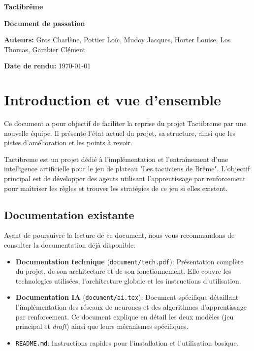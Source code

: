 \documentclass[]{article}
\begin{document}
\begin{titlepage}
  \centering

  \vspace*{4cm}

  \Huge
  \textbf{Tactibrême}

  \vspace{1cm}

  \huge
  \textbf{Document de passation}

  \vfill

  \Large
  \textbf{Auteurs:} Gros Charlène, Pottier Loïc, Mudoy Jacques, Horter Louise, Los Thomas, Gambier Clément

  \vspace{1cm}

  \textbf{Date de rendu:} \today

\end{titlepage}


\tableofcontents

\newpage

\section{Introduction et vue d'ensemble}

Ce document a pour objectif de faciliter la reprise du projet Tactibreme par une nouvelle équipe. Il présente l'état actuel du projet, sa structure, ainsi que les pistes d'amélioration et les points à revoir.

Tactibreme est un projet dédié à l'implémentation et l'entraînement d'une intelligence artificielle pour le jeu de plateau "Les tacticiens de Brême". L'objectif principal est de développer des agents utilisant l'apprentissage par renforcement pour maîtriser les règles et trouver les stratégies de ce jeu si elles existent.

\subsection{Documentation existante}

Avant de poursuivre la lecture de ce document, nous vous recommandons de consulter la documentation déjà disponible:

\begin{itemize}
  \item \textbf{Documentation technique} (\texttt{document/tech.pdf}): Présentation complète du projet, de son architecture et de son fonctionnement. Elle couvre les technologies utilisées, l'architecture globale et les instructions d'utilisation.
  \item \textbf{Documentation IA} (\texttt{document/ai.tex}): Document spécifique détaillant l'implémentation des réseaux de neurones et des algorithmes d'apprentissage par renforcement. Ce document explique en détail les deux modèles (jeu principal et \emph{draft}) ainsi que leurs mécanismes spécifiques.
  \item \texttt{README.md}: Instructions rapides pour l'installation et l'utilisation basique.
\end{itemize}
\end{document}
